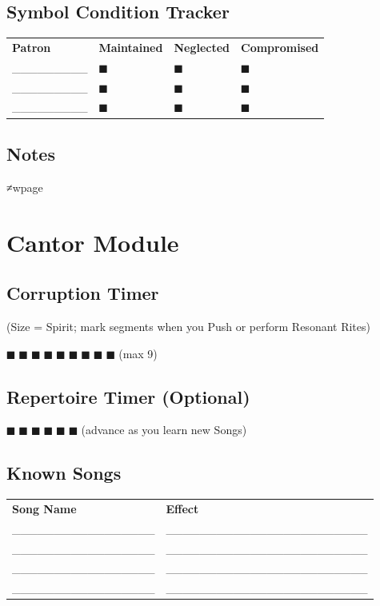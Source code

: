 \documentclass[11pt]{article}
\begin{document}
\subsection*{Symbol Condition Tracker}
\small
\begin{tabularx}{\textwidth}{p{3cm} l l l}
\textbf{Patron} & \textbf{Maintained} & \textbf{Neglected} & \textbf{Compromised} \\
_________ & $■$ & $■$ & $■$ \\
_________ & $■$ & $■$ & $■$ \\
_________ & $■$ & $■$ & $■$ \\
\end{tabularx}
\normalsize

\subsection*{Notes}
\vspace{6cm}
≠wpage

\section*{Cantor Module}

\subsection*{Corruption Timer }
(Size = Spirit; mark segments when you Push or perform Resonant Rites)
\begin{center}
$■$ $■$ $■$ $■$ $■$ $■$ $■$ $■$ $■$ (max 9)
\end{center}

\subsection*{Repertoire Timer (Optional)}
$■$ $■$ $■$ $■$ $■$ $■$ (advance as you learn new Songs)

\subsection*{Known Songs}
\small
\begin{tabularx}{\textwidth}{X X}
\textbf{Song Name} & \textbf{Effect} \\
_________________ & ________________________ \\
_________________ & ________________________ \\
_________________ & ________________________ \\
_________________ & ________________________ \\
\end{tabularx}
\normalsize
\end{document}
